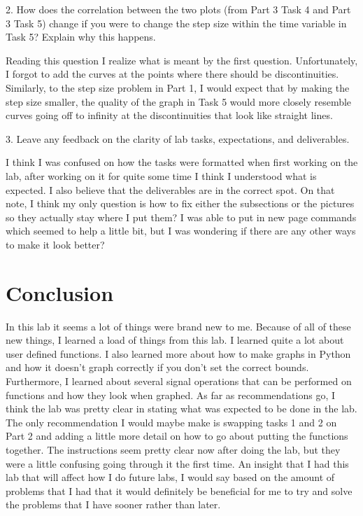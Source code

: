 \documentclass[12pt]{report}
\begin{document}
2. How does the correlation between the two plots (from Part 3 Task 4 and Part 3 Task 5)
change if you were to change the step size within the time variable in Task 5? Explain why this happens.

Reading this question I realize what is meant by the first question. Unfortunately,
I forgot to add the curves at the points where there should be discontinuities. Similarly, to the step size problem in Part 1, I would expect that by making the 
step size smaller, the quality of the graph in Task 5 would more closely resemble 
curves going off to infinity at the discontinuities that look like straight lines.

3. Leave any feedback on the clarity of lab tasks, expectations, and deliverables.

I think I was confused on how the tasks were formatted when first working on the lab, 
after working on it for quite some time I think I understood what is expected. I
also believe that the deliverables are in the correct spot. On that note, I think my only question is how to fix
either the subsections or the pictures so they actually stay where I put them? I was able to put in new page commands which seemed to help a little bit, but I was wondering if there are any other ways to make it look better?

\section{Conclusion}
In this lab it seems a lot of things were brand new to me. Because of all of
these new things, I learned a load of things from this lab. I learned quite a lot about user defined functions. I also learned more about how to make graphs in
Python and how it doesn't graph correctly if you don't set the correct bounds.
Furthermore, I learned about several signal operations that can be performed on
functions and how they look when graphed. As far as recommendations go, I
think the lab was pretty clear in stating what was expected to be done in the
lab. The only recommendation I would maybe make is swapping tasks 1 and 2 on 
Part 2 and adding a little more detail on how to go about putting the 
functions together. The instructions seem pretty clear now after doing the
lab, but they were a little confusing going through it the first time. An insight that I had this lab that will affect how I do future labs, I would
say based on the amount of problems that I had that it would definitely be
beneficial for me to try and solve the problems that I have sooner rather than later.
\end{document}
